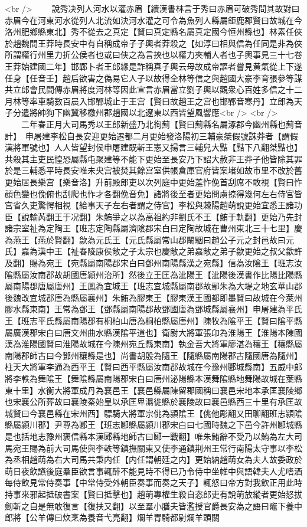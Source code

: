 <br />
　　說秀决列人河水以灌赤眉【續漢書林言于秀曰赤眉可破秀問其故對曰赤眉今在河東河水從列人北流如決河水灌之可令為魚列人縣屬鉅鹿郡賢曰故城在今洛州肥鄉縣東北】秀不從去之真定【賢曰真定縣名屬真定國今恒州縣也】林素任俠於趙魏間王莽時長安中有自稱成帝子子輿者莽殺之【如淳曰相與信為任同是非為俠所謂權行州里力折公侯者也或曰俠之為言挾也以權力夾輔人者也子輿事見三十七卷王莽始建國二年】邯鄲卜者王郎緣是詐稱真子輿云母故成帝謳者嘗見黄氣從上下遂任身【任音壬】趙后欲害之偽易它人子以故得全林等信之與趙國大豪李育張參等謀共立郎會民間傳赤眉將度河林等因此宣言赤眉當立劉子輿以觀衆心百姓多信之十二月林等率車騎數百晨入邯鄲城止于王宫【賢曰故趙王之宫也邯鄲音寒丹】立郎為天子分遣將帥狥下幽冀移檄州郡趙國以北遼東以西皆望風響應<br />
<br />
　　二年春正月大司馬秀以王郎新盛乃北徇薊【賢曰薊縣名屬涿郡今幽州縣也薊音計】　申屠建李松自長安迎更始遷都二月更始發洛陽初三輔豪桀假號誅莽者【謂假漢將軍號也】人人皆望封侯申屠建既斬王憲又揚言三輔兒大黠【黠下八翻桀黠也】共殺其主吏民惶恐屬縣屯聚建等不能下更始至長安乃下詔大赦非王莽子他皆除其罪於是三輔悉平時長安唯未央宫被焚其餘宫室供帳倉庫官府皆案堵如故市里不改於舊更始居長樂宫【樂音洛】升前殿郎吏以次列庭中更始羞怍俛首刮席不敢視【賢曰怍顔色變也俛俯也刮爬也怍才各翻俛音免】諸將後至者更始問虜掠得幾何左右侍官皆宫省久吏驚愕相視【給事天子左右者謂之侍官】李松與棘陽趙萌說更始宜悉王諸功臣【說輸芮翻王于况翻】朱鮪爭之以為高祖約非劉氏不王【鮪于軌翻】更始乃先封諸宗室祉為定陶王【班志定陶縣屬濟隂郡宋白曰定陶故城在曹州東北三十七里】慶為燕王【燕於賢翻】歙為元氏王【元氏縣屬常山郡闞駰曰趙公子元之封邑故曰元氏】嘉為漢中王【祉舂陵康侯敞之子太宗也慶敞之弟嘉敞之弟子歙更始之叔父歙許及翻】賜為宛王【宛縣屬南陽郡宋白曰鄧州南陽縣漢之宛縣】信為汝隂王【班志汝隂縣屬汝南郡故胡國唐潁州治所】然後立王匡為泚陽王【泚陽後漢書作比陽比陽縣屬南陽郡唐屬唐州】王鳳為宜城王【班志宜城縣屬南郡故鄢朱為大堤之地玄華山郡後魏改宜城郡唐為縣屬襄州】朱鮪為膠東王【膠東漢王國都即墨賢曰故城在今萊州膠水縣東南】王常為鄧王【鄧縣屬南陽郡故鄧國唐為鄧城縣屬襄州】申屠建為平氏王【班志平氏縣屬南陽郡有桐柏山唐為桐柏縣屬唐州】陳牧為隂平王【賢曰隂平縣屬廣漢郡宋白曰唐文州曲水縣漢隂平道也】衛尉大將軍張卬為淮陽王【淮陽本陳國漢為淮陽國賢曰淮陽故城在今陳州宛丘縣東南】執金吾大將軍廖湛為穰王【穰縣屬南陽郡師古曰今鄧州穰縣是也】尚書胡殷為隨王【隨縣屬南陽郡古隨國唐為隨州】柱天大將軍李通為西平王【賢曰西平縣屬汝南郡故城在今豫州郾城縣南】五威中郎將李軼為舞隂王【舞隂縣屬南陽郡宋白曰唐州泌陽縣本漢舞隂縣地舞陽故城在葉縣東十里】水衡大將軍成丹為襄邑王【襄邑縣屬陳留郡國稱曰襄邑宋地本承匡襄陵鄉也宋襄公所葬故曰襄陵秦始皇以承匡卑濕徙縣於襄陵故曰襄邑縣西三十里有承匡故城賢曰今襄邑縣在宋州西】驃騎大將軍宗佻為潁隂王【佻他彫翻又田聊翻班志潁隂縣屬潁川郡】尹尊為郾王【班志郾縣屬潁川郡宋白曰七國時魏之下邑今許州郾城縣是也括地志豫州褒信縣本漢郾縣地師古曰郾一戰翻】唯朱鮪辭不受乃以鮪為左大司馬宛王賜為前大司馬使與李軼等鎮撫關東又使李通鎮荆州王常行南陽太守事以李松為丞相趙萌為右大司馬共秉内任【内任謂朝廷之内】更始納趙萌女為夫人故委政於萌日夜飲讌後庭羣臣欲言事輒醉不能見時不得已乃令侍中坐帷中與語韓夫人尤嗜酒每侍飲見常侍奏事【中常侍受外朝臣奏事而奏之天子】輒怒曰帝方對我飲正用此時持事來邪起抵破書案【賢曰抵擊也】趙萌專權生殺自恣郎吏有說萌放縱者更始怒拔劒斬之自是無敢復言【復扶又翻】以至羣小膳夫皆濫授官爵長安為之語曰竈下養中郎將【公羊傳曰炊烹為養音弋亮翻】爛羊胃騎都尉爛羊頭關